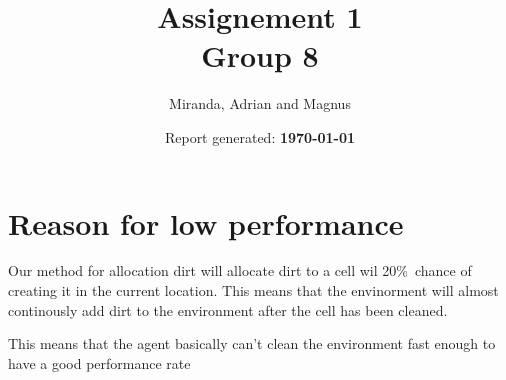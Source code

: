\documentclass[onesided,a4paper,10pt]{article}
\title{ {\Huge Assignement 1 \\\Large Group 8}}
\author{ \Large Miranda, Adrian and Magnus }
\date{ \Large Report generated: \textbf{\today }}
\begin{document}
	\maketitle
	\tableofcontents
	\clearpage
	
	
	
	
	

	\section{Reason for low performance}
		Our method for allocation dirt will allocate dirt to a cell wil 20\%\ chance
		of creating it in the current location.  This means that the envinorment
		will almost continously add dirt to the environment after the cell has been
		cleaned.

		This means that the agent basically can't clean the environment fast enough
		to have a good performance rate
\end{document}
